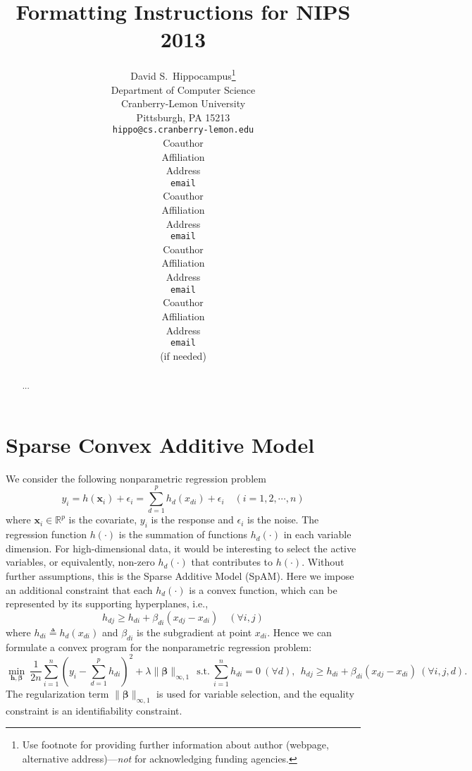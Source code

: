 \documentclass{article} %
\title{Formatting Instructions for NIPS 2013}
\author{
David S.~Hippocampus\thanks{ Use footnote for providing further information
about author (webpage, alternative address)---\emph{not} for acknowledging
funding agencies.} \\
Department of Computer Science\\
Cranberry-Lemon University\\
Pittsburgh, PA 15213 \\
\texttt{hippo@cs.cranberry-lemon.edu} \\
\And
Coauthor \\
Affiliation \\
Address \\
\texttt{email} \\
\AND
Coauthor \\
Affiliation \\
Address \\
\texttt{email} \\
\And
Coauthor \\
Affiliation \\
Address \\
\texttt{email} \\
\And
Coauthor \\
Affiliation \\
Address \\
\texttt{email} \\
(if needed)\\
}
\newcommand{\bds}[1]{\boldsymbol{#1}}
\begin{document}
\maketitle

\begin{abstract}
...
\end{abstract}

\newpage
\section{Sparse Convex Additive Model}
We consider the following nonparametric regression problem
\begin{equation}\nonumber
          y_{i} = h(\bds{x}_{i}) + \epsilon_{i} = \sum_{d=1}^{p}h_{d}(x_{di}) + \epsilon_{i} \quad (i=1,2,\cdots,n)
\end{equation}
where $\bds{x}_{i}\in\mathbb{R}^{p}$ is the covariate, $y_{i}$ is the response and $\epsilon_{i}$ is the noise. The regression function $h(\cdot)$ is the summation of 
functions $h_{d}(\cdot)$ in each variable dimension. For high-dimensional data, it would be interesting to select the active variables, or equivalently, non-zero $h_{d}(\cdot)$
that contributes to $h(\cdot)$. Without further assumptions, this is the Sparse Additive Model (SpAM). Here we impose an additional constraint that each $h_{d}(\cdot)$ is 
a convex function, which can be represented by its supporting hyperplanes, i.e.,
\begin{equation}\nonumber
      h_{dj} \geq h_{di} + \beta_{di}(x_{dj}-x_{di}) \quad (\forall i,j)
\end{equation}
where $h_{di}\triangleq{}h_{d}(x_{di})$ and $\beta_{di}$ is the subgradient at point $x_{di}$. Hence we can formulate a convex program for the nonparametric regression problem:
\begin{equation}\label{nnp}
     \min_{\bds{h},\bds{\beta}} \ \frac{1}{2n}\sum_{i=1}^{n}(y_{i}-\sum_{d=1}^{p}h_{di})^{2} + \lambda\|\bds{\beta}\|_{\infty,1}  \ \ 
     \textrm{s.t.} \ \sum_{i=1}^{n}h_{di}=0  \  (\forall d), \ \ h_{dj} \geq h_{di} + \beta_{di}(x_{dj}-x_{di}) \  (\forall i,j,d).
\end{equation}
The regularization term $\|\bds{\beta}\|_{\infty,1}$ is used for variable selection, and the equality constraint is an identifiability constraint. 
\end{document}
